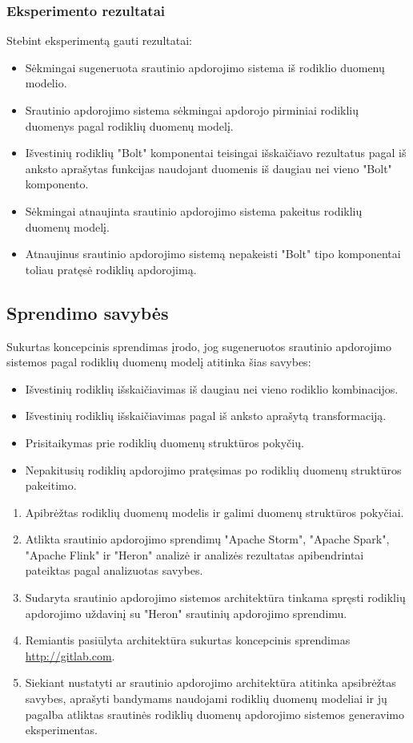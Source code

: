 \documentclass{VUMIFPSbakalaurinis}
\begin{document}
\subsubsection{Eksperimento rezultatai}
Stebint eksperimentą gauti rezultatai:
\begin{itemize}
    \item Sėkmingai sugeneruota srautinio apdorojimo sistema iš rodiklio duomenų modelio.
    \item Srautinio apdorojimo sistema sėkmingai apdorojo pirminiai rodiklių duomenys pagal rodiklių duomenų modelį.
    \item Išvestinių rodiklių "Bolt" komponentai teisingai išskaičiavo rezultatus pagal iš anksto aprašytas funkcijas naudojant duomenis iš daugiau nei vieno "Bolt" komponento.
    \item Sėkmingai atnaujinta srautinio apdorojimo sistema pakeitus rodiklių duomenų modelį.
    \item Atnaujinus srautinio apdorojimo sistemą nepakeisti "Bolt" tipo komponentai toliau pratęsė rodiklių apdorojimą. 
\end{itemize}
\subsection{Sprendimo savybės}

Sukurtas koncepcinis sprendimas įrodo, jog sugeneruotos srautinio apdorojimo sistemos pagal rodiklių duomenų modelį atitinka šias savybes:
\begin{itemize}
    \item Išvestinių rodiklių išskaičiavimas iš daugiau nei vieno rodiklio kombinacijos.
    \item Išvestinių rodiklių išskaičiavimas pagal iš anksto aprašytą transformaciją.
    \item Prisitaikymas prie rodiklių duomenų struktūros pokyčių. 
    \item Nepakitusių rodiklių apdorojimo pratęsimas po rodiklių duomenų struktūros pakeitimo.
\end{itemize} 


\begin{enumerate}
    \item Apibrėžtas rodiklių duomenų modelis ir galimi duomenų struktūros pokyčiai.
    \item Atlikta srautinio apdorojimo sprendimų "Apache Storm", "Apache Spark", "Apache Flink" ir "Heron" analizė ir analizės rezultatas apibendrintai pateiktas pagal analizuotas savybes. 
    \item Sudaryta srautinio apdorojimo sistemos architektūra tinkama spręsti rodiklių apdorojimo uždavinį su "Heron" srautinių apdorojimo sprendimu. 
    \item Remiantis pasiūlyta architektūra sukurtas koncepcinis sprendimas \url{http://gitlab.com}.
    \item Siekiant nustatyti ar srautinio apdorojimo architektūra atitinka apsibrėžtas savybes, aprašyti bandymams naudojami rodiklių duomenų modeliai ir jų pagalba atliktas srautinės rodiklių duomenų apdorojimo sistemos generavimo eksperimentas. 
\end{enumerate}
\end{document}

